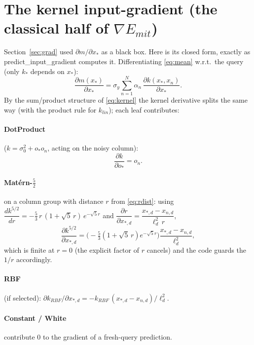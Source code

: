 \documentclass[11pt]{article}
\def\bm#1{#1}%
\def\texttt#1{#1}%
\def\mathrm#1{#1}%
\newcommand{\Emit}{E_{\mathrm{mit}}}
\begin{document}
\appendix

\section{The kernel input-gradient (the classical half of \texorpdfstring{$\nabla\Emit$}{grad E})}
\label{sec:appendix-grad}

Section~\ref{sec:grad} used $\partial m/\partial\bm x_*$ as a black box. Here is
its closed form, exactly as \texttt{predict\_input\_gradient} computes it.
Differentiating \eqref{eq:mean} w.r.t.\ the query (only $\bm k_*$ depends on
$\bm x_*$):
\begin{equation}
\frac{\partial m(\bm x_*)}{\partial \bm x_*}
=\sigma_y\sum_{n=1}^{N}\alpha_n\,\frac{\partial k(\bm x_*,\bm x_n)}{\partial \bm x_*}.
\label{eq:dmdx}
\end{equation}
By the sum/product structure of \eqref{eq:kernel} the kernel derivative splits
the same way (with the product rule for $k_{\mathrm{lin}}$); each leaf
contributes:

\paragraph{DotProduct} ($k=\sigma_0^2+o_*o_n$, acting on the noisy column):
\[
\frac{\partial k}{\partial o_*}=o_n .
\]
\paragraph{Mat\'ern-$\tfrac52$} on a column group with distance $r$ from
\eqref{eq:rdist}: using $\dfrac{dk^{5/2}}{dr}=-\tfrac53\,r\,(1+\sqrt5\,r)\,
e^{-\sqrt5 r}$ and $\dfrac{\partial r}{\partial x_{*,d}}=\dfrac{x_{*,d}-x_{n,d}}{\ell_d^2\,r}$,
\begin{equation}
\frac{\partial k^{5/2}}{\partial x_{*,d}}
=\Big(\!-\tfrac53(1+\sqrt5\,r)e^{-\sqrt5 r}\Big)\frac{x_{*,d}-x_{n,d}}{\ell_d^2},
\end{equation}
which is finite at $r=0$ (the explicit factor of $r$ cancels) and the code guards
the $1/r$ accordingly. \paragraph{RBF} (if selected):
$\partial k_{\mathrm{RBF}}/\partial x_{*,d}=-k_{\mathrm{RBF}}\,(x_{*,d}-x_{n,d})/\ell_d^2$.
\paragraph{Constant / White} contribute $0$ to the gradient of a fresh-query
prediction.
\end{document}
